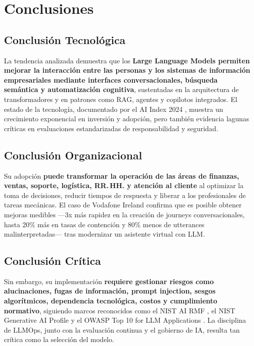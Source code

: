 \documentclass[12pt,a4paper,oneside]{article}
\begin{document}
\section{Conclusiones}

\subsection{Conclusión Tecnológica}

La tendencia analizada demuestra que los \textbf{Large Language Models permiten mejorar la interacción entre las personas y los sistemas de información empresariales mediante interfaces conversacionales, búsqueda semántica y automatización cognitiva}, sustentadas en la arquitectura de transformadores y en patrones como RAG, agentes y copilotos integrados. El estado de la tecnología, documentado por el AI Index 2024 \cite{stanfordAIIndex2024}, muestra un crecimiento exponencial en inversión y adopción, pero también evidencia lagunas críticas en evaluaciones estandarizadas de responsabilidad y seguridad.

\subsection{Conclusión Organizacional}

Su adopción \textbf{puede transformar la operación de las áreas de finanzas, ventas, soporte, logística, RR.\,HH. y atención al cliente} al optimizar la toma de decisiones, reducir tiempos de respuesta y liberar a los profesionales de tareas mecánicas. El caso de Vodafone Ireland \cite{ibmVodafone} confirma que es posible obtener mejoras medibles ---3x más rapidez en la creación de journeys conversacionales, hasta 20\% más en tasas de contención y 80\% menos de utterances malinterpretadas--- tras modernizar un asistente virtual con LLM.

\subsection{Conclusión Crítica}

Sin embargo, su implementación \textbf{requiere gestionar riesgos como alucinaciones, fugas de información, prompt injection, sesgos algorítmicos, dependencia tecnológica, costos y cumplimiento normativo}, siguiendo marcos reconocidos como el NIST AI RMF \cite{nistAIRMF2023}, el NIST Generative AI Profile \cite{nistGenAI2024} y el OWASP Top 10 for LLM Applications \cite{owaspTop10LLM2025}. La disciplina de LLMOps, junto con la evaluación continua y el gobierno de IA, resulta tan crítica como la selección del modelo.
\end{document}
